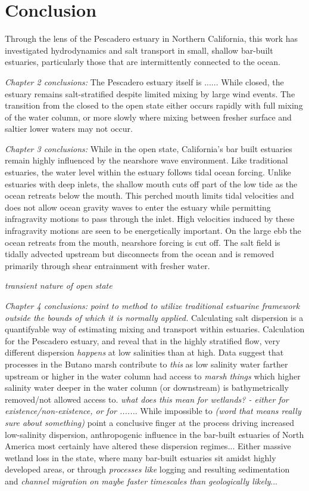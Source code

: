 \chapter{Conclusion}
\label{conclusion}

Through the lens of the Pescadero estuary in Northern California, this work has investigated hydrodynamics and salt transport in small, shallow bar-built estuaries, particularly those that are intermittently connected to the ocean. 

\emph{Chapter 2 conclusions:}
The Pescadero estuary itself is ...... While closed, the estuary remains salt-stratified despite limited mixing by large wind events. The transition from the closed to the open state either occurs rapidly with full mixing of the water column, or more slowly where mixing between fresher surface and saltier lower waters may not occur. 

\emph{Chapter 3 conclusions:}
While in the open state, California's bar built estuaries remain highly influenced by the nearshore wave environment. Like traditional estuaries, the water level within the estuary follows tidal ocean forcing. Unlike estuaries with deep inlets, the shallow mouth cuts off part of the low tide as the ocean retreats below the mouth. This perched mouth limits tidal velocities and does not allow ocean gravity waves to enter the estuary while permitting infragravity motions to pass through the inlet. High velocities induced by these infragravity motions are seen to be energetically important. On the large ebb the ocean retreats from the mouth, nearshore forcing is cut off. The salt field is tidally advected upstream but disconnects from the ocean and is removed primarily through shear entrainment with fresher water. 

\emph{transient nature of open state}


\emph{Chapter 4 conclusions:} \emph{point to method to utilize traditional estuarine framework outside the bounds of which it is normally applied.}
Calculating salt dispersion is a quantifyable way of estimating mixing and transport within estuaries. Calculation for the Pescadero estuary, and reveal that in the highly stratified flow, very different dispersion \emph{happens} at low salinities than at high. Data suggest that processes in the Butano marsh contribute to \emph{this} as low salinity water farther upstream or higher in the water column had access to \emph{marsh things} which higher salinity water deeper in the water column (or downstream) is bathymetrically removed/not allowed access to.  \emph{what does this mean for wetlands? - either for existence/non-existence, or for ......}.  While impossible to \emph{(word that means really sure about something)} point a conclusive finger at the process driving increased low-salinity dispersion, anthropogenic influence in the bar-built estuaries of North America most certainly have altered these dispersion regimes... Either massive wetland loss in the state, where many bar-built estuaries sit amidst highly developed areas, or through \emph{processes like} logging and resulting sedimentation and \emph{channel migration on maybe faster timescales than geologically likely}... 

